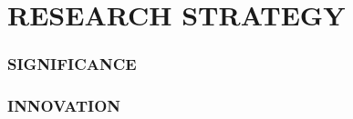 \documentclass[../main.tex]{subfiles}
\begin{document}

\part{RESEARCH STRATEGY}

\section{\MakeUppercase{Significance}} %

\lipsum


\section{\MakeUppercase{Innovation}} %

\lipsum

\subsection{\AimOneText}

\lipsum

\subsection{\AimTwoText}
\lipsum

\subsection{\AimThreeText}
\lipsum
\end{document}
